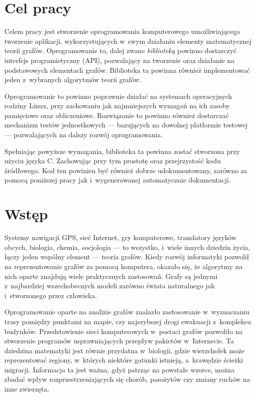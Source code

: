 \documentclass[a4paper,12pt,polish,twoside,openright]{thesis}
\begin{document}
\stronaTytulowa


\tableofcontents

\chapter*{Cel pracy}
Celem pracy jest stworzenie oprogramowania komputerowego umożliwiającego tworzenie aplikacji, wykorzystujących w~swym działaniu elementy matematycznej teorii grafów.
Oprogramowanie to, dalej zwane \emph{biblioteką} powinno dostarczyć interfejs programistyczny (API), pozwalający na tworzenie oraz działanie na podstawowych elementach grafów.
Biblioteka ta powinna również implementować jeden z~wybranych algorytmów teorii grafów.

Oprogramowanie to powinno poprawnie działać na systemach operacyjnych rodziny Linux, przy zachowaniu jak najmniejszych wymagań na ich zasoby pamięciowe oraz obliczeniowe.
Rozwiązanie to powinno również dostarczać mechanizm testów jednostkowych --- bazujących na dowolnej platformie testowej --- pozwalających na dalszy rozwój oprogramowania.

Spełniając powyższe wymagania, biblioteka ta powinna zostać stworzona przy użyciu języka C. Zachowując przy tym prostotę oraz przejrzystość kodu źródłowego.
Kod ten powinien być również dobrze udokumentowany, zarówno za pomocą poniższej pracy jak i~wygenerowanej automatycznie dokumentacji.

\chapter*{Wstęp}
Systemy nawigacji GPS, sieć Internet, gry komputerowe, translatory języków obcych, biologia, chemia, socjologia --- to wszystko, i~wiele innych dziedzin życia, łączy jeden wspólny element --- teoria grafów.
Kiedy rozwój informatyki pozwolił na reprezentowanie grafów za pomocą komputera, okazało się, że algorytmy na nich oparte znajdują wiele praktycznych zastosowań.
Grafy są jednymi z~najbardziej wszechobecnych modeli zarówno świata naturalnego jak i~stworzonego przez człowieka.

Oprogramowanie oparte na analizie grafów znalazło zastosowanie w~wyznaczaniu trasy pomiędzy punktami na mapie, czy najszybszej drogi ewakuacji z~kompleksu budynków.
Przedstawienie sieci komputerowych w~postaci grafów pozwoliło na stworzenie programów usprawniających przepływ pakietów w~Internecie.
Ta dziedzina matematyki jest równie przydatna w~biologii, gdzie wierzchołek może reprezentować regiony, w~których niektóre gatunki istnieją, a~krawędzie ścieżki migracji. Informacja ta jest ważna, gdyż patrząc na powstałe wzorce, można zbadać wpływ rozprzestrzeniających się chorób, pasożytów czy zmiany ruchów na inne zwierzęta.
\end{document}
